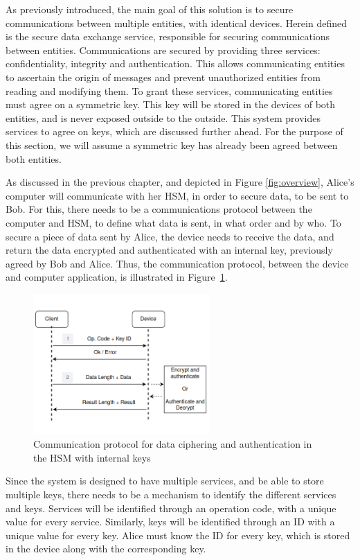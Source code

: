 As previously introduced, the main goal of this solution is to secure communications between multiple entities, with identical devices.
Herein defined is the secure data exchange service, responsible for securing communications between entities. 
Communications are secured by providing three services: confidentiality, integrity and authentication. This allows communicating entities to ascertain the origin of messages and prevent unauthorized entities from reading and modifying them.
To grant these services, communicating entities must agree on a symmetric key. This key will be stored in the devices of both entities, and is never exposed outside to the outside.
This system provides services to agree on keys, which are discussed further ahead. For the purpose of this section, we will assume a symmetric key has already been agreed between both entities.

As discussed in the previous chapter, and depicted in Figure \ref{fig:overview}, Alice's computer will communicate with her HSM, in order to secure data, to be sent to Bob. For this, there needs to be a communications protocol between the computer and HSM, to define what data is sent, in what order and by who. To secure a piece of data sent by Alice, the device needs to receive the data, and return the data encrypted and authenticated with an internal key, previously agreed by Bob and Alice.
Thus, the communication protocol, between the device and computer application, is illustrated in Figure~\ref{fig:protocol:data-exchange}.
\begin{figure}[h!]
	\centering
	\includegraphics[width=0.60\textwidth]{./Images/data-exchange.png}
	\caption{Communication protocol for data ciphering and authentication in the HSM with internal keys}
	\label{fig:protocol:data-exchange}
\end{figure}
Since the system is designed to have multiple services, and be able to store multiple keys, there needs to be a mechanism to identify the different services and keys.
Services will be identified through an operation code, with a unique value for every service. Similarly, keys will be identified through an ID with a unique value for every key. Alice must know the ID for every key, which is stored in the device along with the corresponding key.

